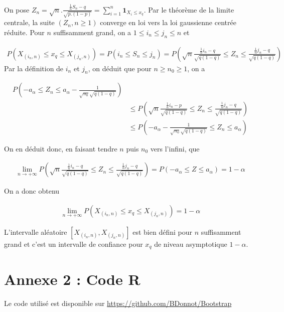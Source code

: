 \documentclass{article}
\renewcommand*{\(}{ \left( }
\renewcommand*{\)}{ \right) }
\begin{document}
On pose $Z_n = \sqrt{n}.\frac{\frac{1}{n}S_n-q}{\sqrt{p.(1-p)}}=\sum_{i=1}^n\mathbf{1}_{X_i\leq x_q}$. Par le théorème de la limite centrale, la suite $(Z_n, n \geq 1)$ converge en loi vers la loi gaussienne centrée réduite. Pour $n$ suffisamment grand, on a $1 \leq i_n \leq j_n \leq n$ et 

\begin{align*}
P\(X_{(i_n,n)}\leq x_q \leq X_{(j_n,n)}\) = P\(i_n \leq S_n \leq j_n\)= P\(\sqrt{n}\frac{\frac{1}{n}i_n-q}{\sqrt{q(1-q)}}\leq Z_n \leq \frac{\frac{1}{n}j_n-q}{\sqrt{q(1-q)}}\)
\end{align*}
Par la définition de $i_n$ et $j_n$, on déduit que pour $n\geq n_0 \geq1$, on a 

\begin{align*}
P\(-a_{\alpha}\leq Z_n \leq a_{\alpha}-\frac{1}{\sqrt{n_0}\sqrt{q(1-q)}}\)\\
&\leq P\(\sqrt{n}\frac{\frac{1}{n}i_n-p}{\sqrt{q(1-q)}}\leq Z_n \leq \frac{\frac{1}{n}j_n-q}{\sqrt{q(1-q)}}\) \\
&\leq P\(-a_{\alpha}-\frac{1}{\sqrt{n_0}\sqrt{q(1-q)}}\leq Z_n \leq a_{\alpha}\)
\end{align*}

On en déduit donc, en faisant tendre $n$ puis $n_0$ vers l'infini, que

\begin{align*}
\lim_{n \rightarrow + \infty}P\(\sqrt{n}\frac{\frac{1}{n}i_n-q}{\sqrt{q(1-q)}}\leq Z_n \leq \frac{\frac{1}{n}j_n-q}{\sqrt{q(1-q)}}\)=P\(-a_{\alpha}\leq Z\leq a_{\alpha}\) = 1- \alpha
\end{align*}

On a donc obtenu 

\begin{align*}
\lim_{n \rightarrow + \infty}P\(X_{(i_n,n)}\leq x_q \leq X_{(j_n,n)}\)=1-\alpha
\end{align*}

L'intervalle aléatoire $[X_{(i_n,n)},X_{(j_n,n)}]$ est bien défini pour $n$ suffisamment grand et c'est un intervalle de confiance pour $x_q$ de niveau asymptotique $1-\alpha$.


\section*{Annexe 2 : Code R}
Le code utilisé est disponible sur \url{https://github.com/BDonnot/Bootstrap}
\end{document}

